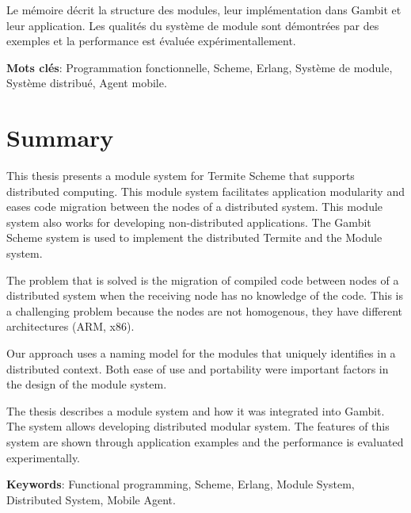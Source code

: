 \documentclass[12pt,maitrise]{dms}
\theoremstyle{definition}
\numberwithin{equation}{section}
\numberwithin{table}{chapter}
\numberwithin{figure}{chapter}
\begin{document}
Le mémoire décrit la structure des modules, leur implémentation dans Gambit et
leur application. Les qualités du système de module sont démontrées par des
exemples et la performance est évaluée expérimentallement.

\vspace*{1.5ex}
\noindent\textbf{Mots clés}: Programmation fonctionnelle,
Scheme, Erlang, Système de module, Système distribué, Agent mobile.


\anglais{}
\chapter*{Summary}

This thesis presents a module system for Termite Scheme that supports
distributed computing.  This module system facilitates application modularity
and eases code migration between the nodes of a distributed system. This module
system also works for developing non-distributed applications.  The Gambit Scheme
system is used to implement the distributed Termite and the Module system.

The problem that is solved is the migration of compiled code between nodes of a
distributed system when the receiving node has no knowledge of the code. This
is a challenging problem because the nodes are not homogenous, they have
different architectures (ARM, x86).

Our approach uses a naming model for the modules
that uniquely identifies in a distributed
context. Both ease of use and portability were important factors
in the design of the module system.

The thesis describes a module system and how it was integrated into Gambit.
The system allows developing distributed modular system.  The features of this
system are shown through application examples and the performance is evaluated
experimentally.


\vspace*{1.5ex}
\noindent\textbf{Keywords}: Functional programming, Scheme, Erlang,
Module System, Distributed System, Mobile Agent.

\end{document}
